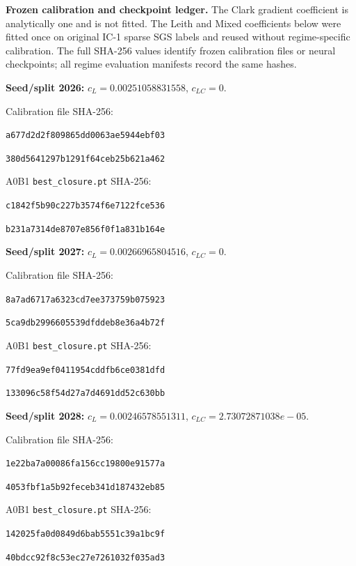 \noindent\textbf{Frozen calibration and checkpoint ledger.} The Clark gradient coefficient is analytically one and is not fitted. The Leith and Mixed coefficients below were fitted once on original IC-1 sparse SGS labels and reused without regime-specific calibration. The full SHA-256 values identify frozen calibration files or neural checkpoints; all regime evaluation manifests record the same hashes.\par

\par\noindent\textbf{Seed/split 2026:} $c_L=0.00251058831558$, $c_{LC}=0$.\par
\noindent Calibration file SHA-256:\par
\noindent\texttt{a677d2d2f809865dd0063ae5944ebf03}\par
\noindent\texttt{380d5641297b1291f64ceb25b621a462}\par
\noindent A0B1 \texttt{best\_closure.pt} SHA-256:\par
\noindent\texttt{c1842f5b90c227b3574f6e7122fce536}\par
\noindent\texttt{b231a7314de8707e856f0f1a831b164e}\par

\par\noindent\textbf{Seed/split 2027:} $c_L=0.00266965804516$, $c_{LC}=0$.\par
\noindent Calibration file SHA-256:\par
\noindent\texttt{8a7ad6717a6323cd7ee373759b075923}\par
\noindent\texttt{5ca9db2996605539dfddeb8e36a4b72f}\par
\noindent A0B1 \texttt{best\_closure.pt} SHA-256:\par
\noindent\texttt{77fd9ea9ef0411954cddfb6ce0381dfd}\par
\noindent\texttt{133096c58f54d27a7d4691dd52c630bb}\par

\par\noindent\textbf{Seed/split 2028:} $c_L=0.00246578551311$, $c_{LC}=2.73072871038e-05$.\par
\noindent Calibration file SHA-256:\par
\noindent\texttt{1e22ba7a00086fa156cc19800e91577a}\par
\noindent\texttt{4053fbf1a5b92feceb341d187432eb85}\par
\noindent A0B1 \texttt{best\_closure.pt} SHA-256:\par
\noindent\texttt{142025fa0d0849d6bab5551c39a1bc9f}\par
\noindent\texttt{40bdcc92f8c53ec27e7261032f035ad3}\par
